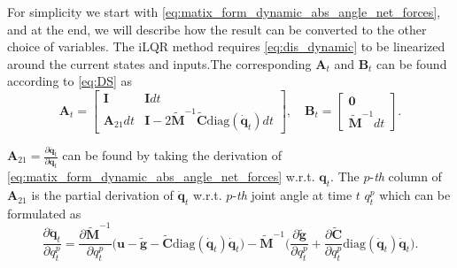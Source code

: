 \documentclass[10pt,a4paper]{article} %
\begin{document}
For simplicity we start with \eqref{eq:matix_form_dynamic_abs_angle_net_forces}, and at the end, we will describe how the result can be converted to the other choice of variables. The iLQR method requires \eqref{eq:dis_dynamic} to be linearized around the current states and inputs.The corresponding $\bm{A}_t$ and $\bm{B}_t$ can be found according to \eqref{eq:DS} as
\begin{equation*}
	\bm{A}_t = \begin{bmatrix}
	\bm{I}  & \bm{I} dt  \\ \bm{A}_{21}dt & \bm{I}-2 \tilde{\bm{M}}^{-1} \tilde{\bm{C}} \text{diag}(\dot{\bm{
	q}}_t) dt
	\end{bmatrix}, \quad
	 \bm{B}_t = \begin{bmatrix}
	\bm{0} \\  \tilde{\bm{M}}^{-1} dt
	\end{bmatrix}. 
\end{equation*}

$\bm{A}_{21} = \frac{\partial \ddot{\bm{q}}_t}{\partial \bm{q}_t}$ can be found by taking the derivation of \eqref{eq:matix_form_dynamic_abs_angle_net_forces} w.r.t. $\bm{q}_t$. The $p$-\emph{th} column of $\bm{A}_{21}$ is the partial derivation of $\ddot{\bm{q}}_t$ w.r.t. $p$-\emph{th} joint angle at time $t$ $q_t^p$ which can be formulated as
\begin{equation*}
	\frac{\partial \ddot{\bm{q}}_t}{\partial q_t^p} = \frac{\partial \tilde{\bm{M}}^{-1}}{\partial q_t^p} 
	\Big(\bm{u} - \tilde{\bm{g}} - \tilde{\bm{C}}\text{diag}(\bm{\dot{q}}_t)\bm{\dot{q}}_t\Big) - 
	\tilde{\bm{M}}^{-1} \Big(\frac{\partial \tilde{\bm{g}}}{\partial q_t^p} + 
	\frac{\partial \tilde{\bm{C}}}{\partial q_t^p} \text{diag}(\dot{\bm{q}}_t)\dot{\bm{q}}_t\Big).
\end{equation*}
\end{document}
